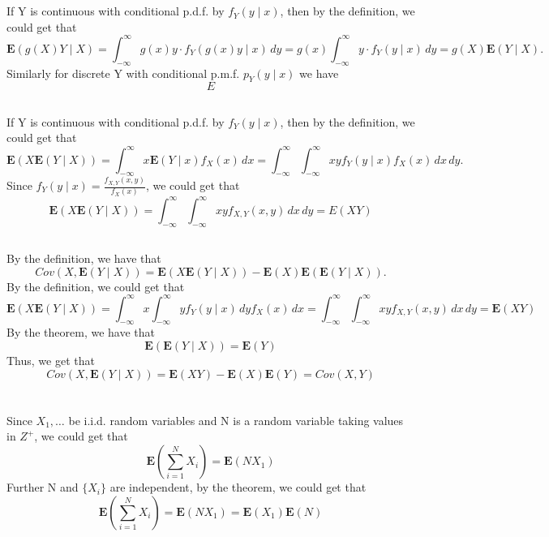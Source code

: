 \documentclass[10.5pt]{article}
\begin{document}
\section{}
\subsection{}
If Y is continuous with conditional p.d.f. by $f_Y(y\mid x)$, then by the definition, we could get that $$\mathbf{E}(g(X)Y\mid X)=\int_{-\infty}^{\infty}g(x)y\cdot f_Y(g(x)y\mid x)\,dy=g(x)\int_{-\infty}^{\infty}y\cdot f_Y(y\mid x)\,dy=g(X)\mathbf{E}(Y\mid X).$$\indent
Similarly for discrete Y with conditional p.m.f. $p_Y(y\mid x)$ we have $$E$$
\subsection{}
If Y is continuous with conditional p.d.f. by $f_Y(y\mid x)$, then by the definition, we could get that $$\mathbf{E}(X\mathbf{E}(Y\mid X))=\int_{-\infty}^{\infty}x\mathbf{E}(Y\mid x)f_X(x)\,dx=\int_{-\infty}^{\infty}\int_{-\infty}^{\infty}xyf_Y(y\mid x)f_X(x)\,dx\,dy.$$\indent
Since $f_Y(y\mid x)=\frac{f_{X,Y}(x,y)}{f_X(x)}$, we could get that $$\mathbf{E}(X\mathbf{E}(Y\mid X))=\int_{-\infty}^{\infty}\int_{-\infty}^{\infty}xyf_{X,Y}(x,y)\,dx\,dy=E(XY)$$
\subsection{}
By the definition, we have that $$Cov(X,\mathbf{E}(Y\mid X))=\mathbf{E}(X\mathbf{E}(Y\mid X))-\mathbf{E}(X)\mathbf{E}(\mathbf{E}(Y\mid X)).$$\indent
By the definition, we could get that $$\mathbf{E}(X\mathbf{E}(Y\mid X))=\int_{-\infty}^{\infty}x\int_{-\infty}^{\infty}yf_Y(y\mid x)\,dyf_X(x)\,dx=\int_{-\infty}^{\infty}\int_{-\infty}^{\infty}xyf_{X,Y}(x,y)\,dx\,dy=\mathbf{E}(XY)$$\indent
By the theorem, we have that $$\mathbf{E}(\mathbf{E}(Y\mid X))=\mathbf{E}(Y)$$\indent
Thus, we get that $$Cov(X,\mathbf{E}(Y\mid X))=\mathbf{E}(XY)-\mathbf{E}(X)\mathbf{E}(Y)=Cov(X,Y)$$\indent

\section{}
Since $X_1,\dots$ be i.i.d. random variables and N is a random variable taking values in $Z^+$, we could get that $$\mathbf{E}\left(\sum_{i=1}^NX_i\right)=\mathbf{E}(NX_1)$$\indent
Further N and $\{X_i\}$ are independent, by the theorem, we could get that $$\mathbf{E}\left(\sum_{i=1}^NX_i\right)=\mathbf{E}(NX_1)=\mathbf{E}(X_1)\mathbf{E}(N)$$
\end{document}
